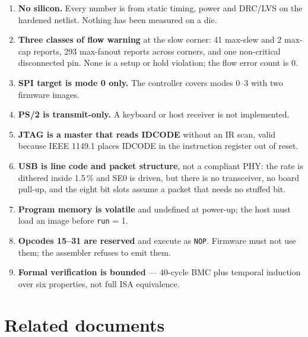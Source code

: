 \documentclass[10pt,a4paper]{article}
\begin{document}
\begin{enumerate}
  \item \textbf{No silicon.} Every number is from static timing, power and
        DRC/LVS on the hardened netlist. Nothing has been measured on a die.
  \item \textbf{Three classes of flow warning} at the slow corner: 41 max-slew
        and 2 max-cap reports, 293 max-fanout reports across corners, and one
        non-critical disconnected pin. None is a setup or hold violation; the
        flow error count is 0.
  \item \textbf{SPI target is mode 0 only.} The controller covers modes 0--3
        with two firmware images.
  \item \textbf{PS/2 is transmit-only.} A keyboard or host receiver is not
        implemented.
  \item \textbf{JTAG is a master that reads IDCODE} without an IR scan, valid
        because IEEE 1149.1 places IDCODE in the instruction register out of reset.
  \item \textbf{USB is line code and packet structure}, not a compliant PHY: the
        rate is dithered inside 1.5\,\% and SE0 is driven, but there is no
        transceiver, no board pull-up, and the eight bit slots assume a packet
        that needs no stuffed bit.
  \item \textbf{Program memory is volatile} and undefined at power-up; the host
        must load an image before \texttt{run} = 1.
  \item \textbf{Opcodes 15--31 are reserved} and execute as \texttt{NOP}. Firmware
        must not use them; the assembler refuses to emit them.
  \item \textbf{Formal verification is bounded} --- 40-cycle BMC plus temporal
        induction over six properties, not full ISA equivalence.
\end{enumerate}

\section{Related documents}
\end{document}
